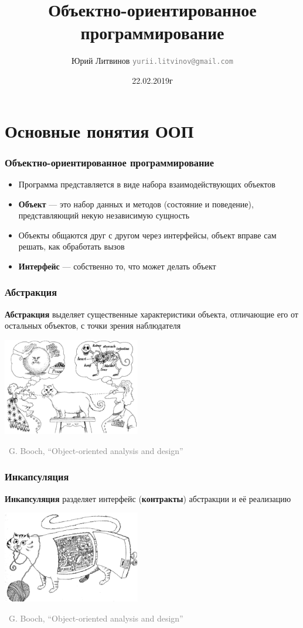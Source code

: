 \documentclass[xetex,mathserif,serif]{beamer}
\title{Объектно-ориентированное программирование}
\author[Юрий Литвинов]{Юрий Литвинов \newline \textcolor{gray}{\small\texttt{yurii.litvinov@gmail.com}}}
\date{22.02.2019г}
\newcommand{\attribution}[1] {
	\begin{flushright}\begin{scriptsize}\textcolor{gray}{\textcopyright\, #1}\end{scriptsize}\end{flushright}
}
\begin{document}
	
	\frame{\titlepage}

	\section{Основные понятия ООП}

	\begin{frame}
		\frametitle{Объектно-ориентированное программирование}
		\begin{itemize}
			\item Программа представляется в виде набора взаимодействующих объектов
			\item \textbf{Объект} --- это набор данных и методов (состояние и поведение), представляющий некую независимую сущность
			\item Объекты общаются друг с другом через интерфейсы, объект вправе сам решать, как обработать вызов
			\item \textbf{Интерфейс} --- собственно то, что может делать объект
		\end{itemize}
	\end{frame}

	\begin{frame}
		\frametitle{Абстракция}
		\textbf{Абстракция} выделяет существенные характеристики объекта, отличающие его от остальных объектов, с точки зрения наблюдателя
		\vskip 1cm
		\begin{center}
			\includegraphics[width=0.45\textwidth]{abstraction.png}
		\end{center}
		\attribution{G. Booch, ``Object-oriented analysis and design''}
	\end{frame}

	\begin{frame}
		\frametitle{Инкапсуляция}
		\textbf{Инкапсуляция} разделяет интерфейс (\textbf{контракты}) абстракции и её реализацию

		\vskip 1cm
		\begin{center}
			\includegraphics[width=0.45\textwidth]{incapsulation.png}
		\end{center}
		\attribution{G. Booch, ``Object-oriented analysis and design''}
	\end{frame}
\end{document}
